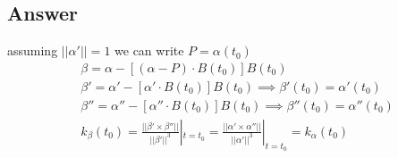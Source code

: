 \documentclass[
	12pt, %
]{fphw}
\theoremstyle{plain}
\begin{document}
\subsection*{Answer}
assuming $||\alpha'||=1$ we can write $P=\alpha(t_0)$
\begin{align*}
&\beta = \alpha - [(\alpha - P)\cdot B(t_0)]B(t_0) \\
&\beta' = \alpha' - [\alpha'\cdot B(t_0)]B(t_0) \implies \beta'(t_0)=\alpha'(t_0) \\
&\beta'' = \alpha'' - [\alpha''\cdot B(t_0)]B(t_0) \implies \beta''(t_0)=\alpha''(t_0) \\
&k_\beta(t_0) = \frac{||\beta' \times \beta''||}{||\beta'||^3}|_{t=t_0} = \frac{||\alpha' \times \alpha''||}{||\alpha'||^3}|_{t=t_0} = k_\alpha (t_0)
\end{align*}
\end{document}
